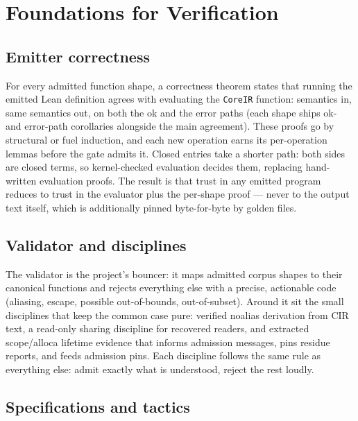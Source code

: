 \chapter{Foundations for Verification}
\label{ch:verification}

\section{Emitter correctness}

For every admitted function shape, a correctness theorem states that
running the emitted Lean definition agrees with evaluating the
\texttt{CoreIR} function: semantics in, same semantics out, on both
the ok and the error paths (each shape ships ok- and error-path
corollaries alongside the main agreement). These proofs
go by structural or fuel induction, and each new operation earns its
per-operation lemmas before the gate admits it. Closed entries take a
shorter path: both sides are closed terms, so kernel-checked evaluation
decides them, replacing hand-written evaluation proofs. The result is that trust
in any emitted program reduces to trust in the evaluator plus the
per-shape proof --- never to the output text itself, which is additionally
pinned byte-for-byte by golden files.

\section{Validator and disciplines}

The validator is the project's bouncer: it maps admitted corpus shapes to
their canonical functions and rejects everything else with a precise,
actionable code (aliasing, escape, possible out-of-bounds, out-of-subset).
Around it sit the small disciplines that keep the common case pure:
verified noalias derivation from CIR text, a read-only sharing discipline
for recovered readers, and extracted scope/alloca lifetime evidence that
informs admission messages, pins residue reports, and feeds admission
pins. Each discipline follows the same rule as everything else: admit
exactly what is understood, reject the rest loudly.

\section{Specifications and tactics}

